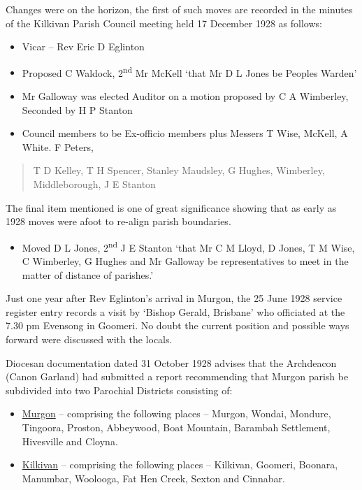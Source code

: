 Changes were on the horizon, the first of such moves are recorded in the
minutes of the Kilkivan Parish Council meeting held 17 December 1928 as
follows:

\begin{itemize}
\item
  Vicar -- Rev Eric D Eglinton
\item
  Proposed C Waldock, 2\textsuperscript{nd} Mr McKell `that Mr D L Jones
  be Peoples Warden'
\item
  Mr Galloway was elected Auditor on a motion proposed by C A Wimberley,
  Seconded by H P Stanton
\item
  Council members to be Ex-officio members plus Messers T Wise, McKell,
  A White. F Peters,
\end{itemize}

\begin{quote}
T D Kelley, T H Spencer, Stanley Maudsley, G Hughes, Wimberley,
Middleborough, J E Stanton
\end{quote}

The final item mentioned is one of great significance showing that as
early as 1928 moves were afoot to re-align parish boundaries.

\begin{itemize}
\item
  Moved D L Jones, 2\textsuperscript{nd} J E Stanton `that Mr C M Lloyd,
  D Jones, T M Wise, C Wimberley, G Hughes and Mr Galloway be
  representatives to meet in the matter of distance of parishes.'
\end{itemize}

Just one year after Rev Eglinton's arrival in Murgon, the 25 June 1928
service register entry records a visit by `Bishop Gerald, Brisbane' who
officiated at the 7.30 pm Evensong in Goomeri. No doubt the current
position and possible ways forward were discussed with the locals.

Diocesan documentation dated 31 October 1928 advises that the Archdeacon
(Canon Garland) had submitted a report recommending that Murgon parish
be subdivided into two Parochial Districts consisting of:

\begin{itemize}
\item
  \underline{Murgon} -- comprising the following places -- Murgon,
  Wondai, Mondure, Tingoora, Proston, Abbeywood, Boat Mountain, Barambah
  Settlement, Hivesville and Cloyna.
\item
  \underline{Kilkivan} -- comprising the following places -- Kilkivan,
  Goomeri, Boonara, Manumbar, Woolooga, Fat Hen Creek, Sexton and
  Cinnabar.
\end{itemize}

